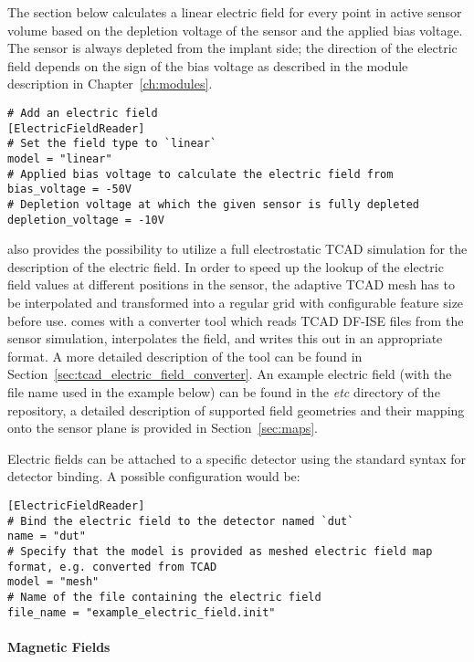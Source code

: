 The section below calculates a linear electric field for every point in active sensor volume based on the depletion voltage of the sensor and the applied bias voltage.
The sensor is always depleted from the implant side; the direction of the electric field depends on the sign of the bias voltage as described in the module description in Chapter~\ref{ch:modules}.
\begin{verbatim}
# Add an electric field
[ElectricFieldReader]
# Set the field type to `linear`
model = "linear"
# Applied bias voltage to calculate the electric field from
bias_voltage = -50V
# Depletion voltage at which the given sensor is fully depleted
depletion_voltage = -10V
\end{verbatim}

\apsq also provides the possibility to utilize a full electrostatic TCAD simulation for the description of the electric field.
In order to speed up the lookup of the electric field values at different positions in the sensor, the adaptive TCAD mesh has to be interpolated and transformed into a regular grid with configurable feature size before use.
\apsq comes with a converter tool which reads TCAD DF-ISE files from the sensor simulation, interpolates the field, and writes this out in an appropriate format.
A more detailed description of the tool can be found in Section~\ref{sec:tcad_electric_field_converter}.
An example electric field (with the file name used in the example below) can be found in the \textit{etc} directory of the \apsq repository, a detailed description of supported field geometries and their mapping onto the sensor plane is provided in Section~\ref{sec:maps}.

Electric fields can be attached to a specific detector using the standard syntax for detector binding.
A possible configuration would be:
\begin{verbatim}
[ElectricFieldReader]
# Bind the electric field to the detector named `dut`
name = "dut"
# Specify that the model is provided as meshed electric field map format, e.g. converted from TCAD
model = "mesh"
# Name of the file containing the electric field
file_name = "example_electric_field.init"
\end{verbatim}

\paragraph{Magnetic Fields}
\label{sec:module_magnetic_field}

